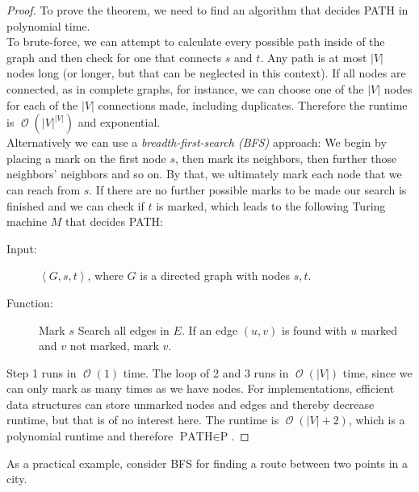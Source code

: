 \documentclass[10pt,fleqn]{article}
\theoremstyle{definition}
\theoremstyle{remark}
\newcommand{\pclass}{\text{P}}
\newcommand{\pathprob}{\text{PATH}}
\newcommand{\lpp}{\left \langle}
\newcommand{\rpp}{\right \rangle}
\newcommand{\enc}[1]{\lpp #1 \rpp}
\DeclareMathOperator{\onot}{\mathcal{O}}
\begin{document}
\begin{proof} To prove the theorem, we need to find an algorithm that decides PATH in polynomial time.\\
    
To brute-force, we can attempt to calculate every possible path inside of the graph and then check for one that connects \(s\) and \(t\). Any path is at most \(|V|\) nodes long (or longer, but that can be neglected in this context). If all nodes are connected, as in complete graphs, for instance, we can choose one of the \(|V|\) nodes for each of the \(|V|\) connections made, including duplicates. Therefore the runtime is \(\onot{(|V|^{|V|})}\) and exponential.\\

Alternatively we can use a \emph{breadth-first-search (BFS)} approach: We begin by placing a mark on the first node \(s\), then mark its neighbors, then further those neighbors' neighbors and so on. By that, we ultimately mark each node that we can reach from \(s\). If there are no further possible marks to be made our search is finished and we can check if \(t\) is marked, which leads to the following Turing machine \(M\) that decides PATH:

\begin{description}
    \item[Input:] \(\enc{G, s, t}\), where \(G\) is a directed graph with nodes \(s, t\).
    \item[Function:] \phantom{}
    \begin{algorithmic}[1]
        \State Mark \(s\)
            \State Search all edges in \(E\). If an edge \((u, v)\) is found with \(u\) marked and \(v\) not marked, mark \(v\).
        \EndWhile
    \end{algorithmic}
\end{description}

Step 1 runs in \(\onot{(1)}\) time. The loop of 2 and 3 runs in \(\onot{(|V|)}\) time, since we can only mark as many times as we have nodes. For implementations, efficient data structures can store unmarked nodes and edges and thereby decrease runtime, but that is of no interest here. The runtime is \(\onot{(|V| + 2)}\), which is a polynomial runtime and therefore \(\pathprob \in \pclass\).
\end{proof}
As a practical example, consider BFS for finding a route between two points in a city.
\newpage
\end{document}

